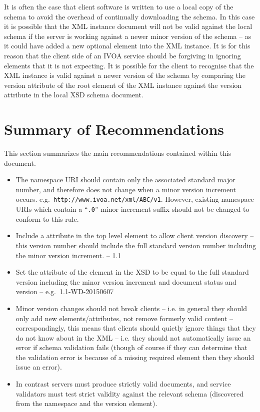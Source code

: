 \documentclass[10pt,a4paper]{ivoa}
\begin{document}
It is often the case that client software is written to use a local copy of the
schema to avoid the overhead of continually downloading the schema. In this case
it is possible that the XML instance document will not be valid against the
local schema if the server is working against a newer minor version of the
schema -- as it could have added a new optional element into the XML instance.
It is for this reason that the client side of an IVOA service should be
forgiving in ignoring elements that it is not expecting. It is possible for the
client to recognise that the XML instance is valid against a newer version of
the schema by comparing the version attribute of the root element of the XML
instance against the version attribute in the local XSD schema document.

\section{Summary of Recommendations}
This section summarizes the main recommendations contained within this document.

\begin{itemize}
\item The namespace URI should contain only the associated standard major number,
and therefore does not change when a minor version increment occurs.
e.g.\ \texttt{http://www.ivoa.net/xml/ABC/v1}. However, existing namespace URIs
which contain a ``\texttt{.0}'' minor increment suffix should not be changed to
conform to this rule.

\item Include a  attribute in the top level element to allow
client version discovery -- this version number should include the full standard version
number including the minor version increment. -- 1.1

\item Set the  attribute of the  element in the
XSD to be equal to the full standard version including the minor version
increment and document status and version -- e.g.\ 1.1-WD-20150607

\item Minor version changes should not break clients -- i.e. in general they
should only add new elements/attributes, not remove formerly valid
content --
correspondingly, this means that clients should quietly ignore things that they
do not know about in the XML -- i.e. they should not automatically issue an error
if schema validation fails (though of course if they can determine that the
validation error is because of a missing required element then they should
issue an error).
\item In contrast servers must produce strictly valid documents, and service
validators must test strict validity against the relevant schema (discovered
from the namespace and the version element).
\end{itemize}
\end{document}
